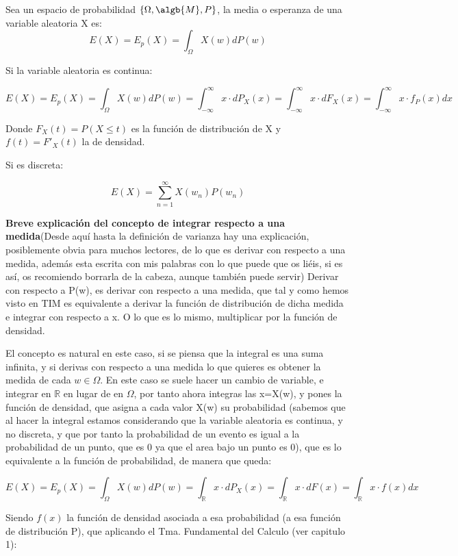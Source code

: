 \documentclass{apuntes}
\begin{document}
\begin{defn}
Sea un espacio de probabilidad $\{\Omega, \algb{M},P\}$, la media o esperanza de una variable aleatoria X es:
\[
E(X)=E_p(X)=\int_{\Omega}X(w)dP(w)
\]

Si la variable aleatoria es continua:

\[
E(X)=E_p(X)=\int_{\Omega}X(w)dP(w) = \int_{-\infty}^{\infty}x\cdot dP_X(x)= \int_{-\infty}^{\infty}x\cdot dF_X(x) = \int_{-\infty}^{\infty}x\cdot f_P(x) dx
\]

Donde $F_X(t)=P(X \leq t)$ es la función de distribución de X y $f(t)=F'_X(t)$ la de densidad.

Si es discreta:

\[
E(X)=\sum_{n=1}^{\infty}X(w_n)P(w_n)
\]


\obs \textbf{Breve explicación del concepto de integrar respecto a una medida}(Desde aquí hasta la definición de varianza hay una explicación, posiblemente obvia para muchos lectores,  de lo que es derivar con respecto a una medida, además esta escrita con mis palabras con lo que puede que os liéis, si es así, os recomiendo borrarla de la cabeza, aunque también puede servir) Derivar con respecto a P(w), es derivar con respecto a una medida, que tal y como hemos visto en TIM es equivalente a derivar la función de distribución de dicha medida e integrar con respecto a x. O lo que es lo mismo, multiplicar por la función de densidad. 

El concepto es natural en este caso, si se piensa que la integral es una suma infinita, y si derivas con respecto a una medida lo que quieres es obtener la medida de cada $w \in \Omega$. En este caso se suele hacer un cambio de variable, e integrar en $\mathbb{R}$ en lugar de en $\Omega$, por tanto ahora integras las x=X(w), y pones la función de densidad, que asigna a cada valor X(w) su probabilidad (sabemos que al hacer la integral estamos considerando que la variable aleatoria es continua, y no discreta, y que por tanto la probabilidad de un evento es igual a la probabilidad de un punto, que es 0 ya que el area bajo un punto es 0), que es lo equivalente a la función de probabilidad, de manera que queda:

\[
E(X)=E_p(X)=\int_{\Omega}X(w)dP(w) = \int_{\mathbb{R}}x\cdot dP_X(x)= \int_{\mathbb{R}}x\cdot dF(x) = \int_{\mathbb{R}}x\cdot f(x) dx
\]

Siendo $f(x)$ la función de densidad asociada a esa probabilidad (a esa función de distribución P), que aplicando el Tma. Fundamental del Calculo (ver capitulo 1):


\end{defn}
\end{document}
